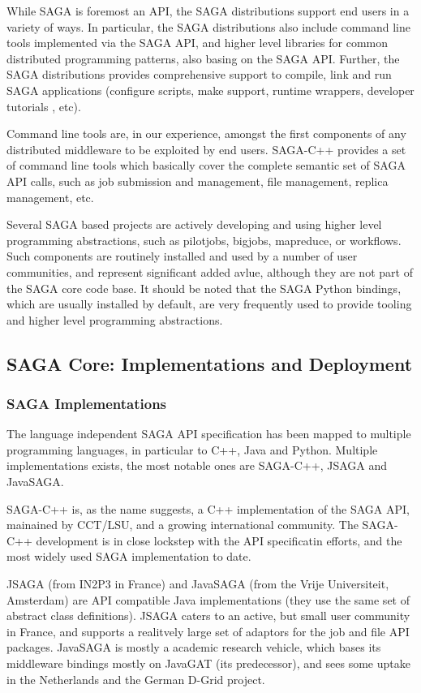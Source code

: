 \documentclass[12pt]{article}
\begin{document}
  While SAGA is foremost an API, the SAGA distributions support end
  users in a variety of ways.  In particular, the SAGA distributions
  also include command line tools implemented via the SAGA API, and
  higher level libraries for common distributed programming patterns,
  also basing on the SAGA API.  Further, the SAGA distributions
  provides comprehensive support to compile, link and run SAGA
  applications (configure scripts, make support, runtime wrappers,
  developer tutorials , etc).

  Command line tools are, in our experience, amongst the first
  components of any distributed middleware to be exploited by end
  users.  SAGA-C++ provides a set of command line tools which
  basically cover the complete semantic set of SAGA API calls, such as
  job submission and management, file management, replica management,
  etc.

  Several SAGA based projects are actively developing and using higher
  level programming abstractions, such as pilotjobs, bigjobs,
  mapreduce, or workflows.  Such components are routinely installed
  and used by a number of user communities, and represent significant
  added avlue, although they are not part of the SAGA core code base.
  It should be noted that the SAGA Python bindings, which are usually
  installed by default, are very frequently used to provide tooling and
  higher level programming abstractions.


 \subsection{SAGA Core: Implementations and Deployment}

  \subsubsection{SAGA Implementations}

   The language independent SAGA API specification has been mapped to
   multiple programming languages, in particular to C++, Java and
   Python.  Multiple implementations exists, the most notable ones are
   SAGA-C++, JSAGA and JavaSAGA.

   SAGA-C++ is, as the name suggests, a C++ implementation of the SAGA
   API, mainained by CCT/LSU, and a growing international community.
   The SAGA-C++ development is in close lockstep with the API
   specificatin efforts, and the most widely used SAGA implementation
   to date. 
   
   JSAGA (from IN2P3 in France) and JavaSAGA (from the Vrije
   Universiteit, Amsterdam) are API compatible Java implementations
   (they use the same set of abstract class definitions).  JSAGA
   caters to an active, but small user community in France, and
   supports a realitvely large set of adaptors for the job and file
   API packages.  JavaSAGA is mostly a academic research vehicle,
   which bases its middleware bindings mostly on JavaGAT (its
   predecessor), and sees some uptake in the Netherlands and the
   German D-Grid project.
\end{document}
